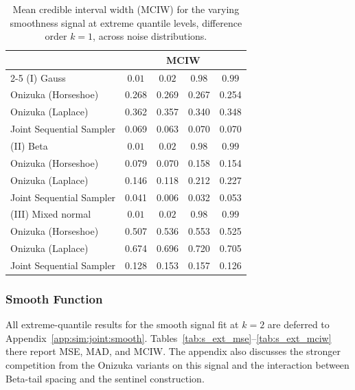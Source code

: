 \begin{table}[htbp]
\centering
\caption{Mean credible interval width (MCIW) for the varying smoothness signal at extreme quantile levels, difference order $k = 1$, across noise distributions.}
\label{tab:vs_ext_mciw}
\begin{tabular}{lcccc}
\toprule
& \multicolumn{4}{c}{MCIW} \\
\cmidrule(lr){2-5}
(I) Gauss & $0.01$ & $0.02$ & $0.98$ & $0.99$ \\
\midrule
Onizuka (Horseshoe)      & 0.268 & 0.269 & 0.267 & 0.254 \\
Onizuka (Laplace)        & 0.362 & 0.357 & 0.340 & 0.348 \\
Joint Sequential Sampler & 0.069 & 0.063 & 0.070 & 0.070 \\
\midrule
(II) Beta & $0.01$ & $0.02$ & $0.98$ & $0.99$ \\
\midrule
Onizuka (Horseshoe)      & 0.079 & 0.070 & 0.158 & 0.154 \\
Onizuka (Laplace)        & 0.146 & 0.118 & 0.212 & 0.227 \\
Joint Sequential Sampler & 0.041 & 0.006 & 0.032 & 0.053 \\
\midrule
(III) Mixed normal & $0.01$ & $0.02$ & $0.98$ & $0.99$ \\
\midrule
Onizuka (Horseshoe)      & 0.507 & 0.536 & 0.553 & 0.525 \\
Onizuka (Laplace)        & 0.674 & 0.696 & 0.720 & 0.705 \\
Joint Sequential Sampler & 0.128 & 0.153 & 0.157 & 0.126 \\
\bottomrule
\end{tabular}
\end{table}

\subsubsection{Smooth Function}
\label{sec:sim:joint:smooth}

All extreme-quantile results for the smooth signal fit at $k=2$ are deferred to Appendix~\ref{app:sim:joint:smooth}. Tables~\ref{tab:s_ext_mse}--\ref{tab:s_ext_mciw} there report MSE, MAD, and MCIW. The appendix also discusses the stronger competition from the Onizuka variants on this signal and the interaction between Beta-tail spacing and the sentinel construction.

